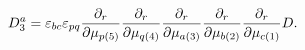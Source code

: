 \begin{equation*}
D_{3}^{a}=\varepsilon _{bc}\varepsilon _{pq}\frac{\partial _{r}}{\partial
\mu _{p(5)}}\frac{\partial _{r}}{\partial \mu _{q(4)}}\frac{\partial _{r}}{%
\partial \mu _{a(3)}}\frac{\partial _{r}}{\partial \mu _{b(2)}}\frac{%
\partial _{r}}{\partial \mu _{c(1)}}D.
\end{equation*}

